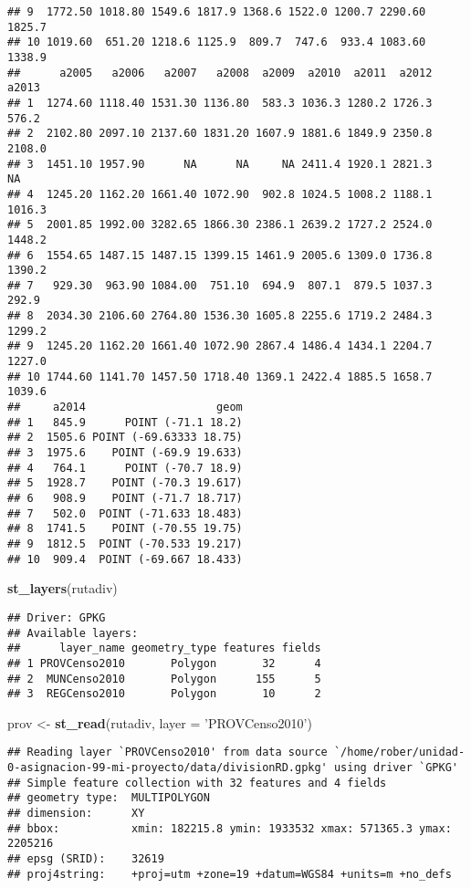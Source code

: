 \documentclass[11pt,]{article}
\newenvironment{Shaded}{\begin{snugshade}}{\end{snugshade}}
\newcommand{\KeywordTok}[1]{\textcolor[rgb]{0.13,0.29,0.53}{\textbf{#1}}}
\newcommand{\DataTypeTok}[1]{\textcolor[rgb]{0.13,0.29,0.53}{#1}}
\newcommand{\StringTok}[1]{\textcolor[rgb]{0.31,0.60,0.02}{#1}}
\newcommand{\NormalTok}[1]{#1}
\begin{document}
\begin{verbatim}
## 9  1772.50 1018.80 1549.6 1817.9 1368.6 1522.0 1200.7 2290.60 1825.7
## 10 1019.60  651.20 1218.6 1125.9  809.7  747.6  933.4 1083.60 1338.9
##      a2005   a2006   a2007   a2008  a2009  a2010  a2011  a2012  a2013
## 1  1274.60 1118.40 1531.30 1136.80  583.3 1036.3 1280.2 1726.3  576.2
## 2  2102.80 2097.10 2137.60 1831.20 1607.9 1881.6 1849.9 2350.8 2108.0
## 3  1451.10 1957.90      NA      NA     NA 2411.4 1920.1 2821.3     NA
## 4  1245.20 1162.20 1661.40 1072.90  902.8 1024.5 1008.2 1188.1 1016.3
## 5  2001.85 1992.00 3282.65 1866.30 2386.1 2639.2 1727.2 2524.0 1448.2
## 6  1554.65 1487.15 1487.15 1399.15 1461.9 2005.6 1309.0 1736.8 1390.2
## 7   929.30  963.90 1084.00  751.10  694.9  807.1  879.5 1037.3  292.9
## 8  2034.30 2106.60 2764.80 1536.30 1605.8 2255.6 1719.2 2484.3 1299.2
## 9  1245.20 1162.20 1661.40 1072.90 2867.4 1486.4 1434.1 2204.7 1227.0
## 10 1744.60 1141.70 1457.50 1718.40 1369.1 2422.4 1885.5 1658.7 1039.6
##     a2014                    geom
## 1   845.9      POINT (-71.1 18.2)
## 2  1505.6 POINT (-69.63333 18.75)
## 3  1975.6    POINT (-69.9 19.633)
## 4   764.1      POINT (-70.7 18.9)
## 5  1928.7    POINT (-70.3 19.617)
## 6   908.9    POINT (-71.7 18.717)
## 7   502.0  POINT (-71.633 18.483)
## 8  1741.5    POINT (-70.55 19.75)
## 9  1812.5  POINT (-70.533 19.217)
## 10  909.4  POINT (-69.667 18.433)
\end{verbatim}

\begin{Shaded}
\begin{Highlighting}[]
\KeywordTok{st_layers}\NormalTok{(rutadiv)}
\end{Highlighting}
\end{Shaded}

\begin{verbatim}
## Driver: GPKG 
## Available layers:
##      layer_name geometry_type features fields
## 1 PROVCenso2010       Polygon       32      4
## 2  MUNCenso2010       Polygon      155      5
## 3  REGCenso2010       Polygon       10      2
\end{verbatim}

\begin{Shaded}
\begin{Highlighting}[]
\NormalTok{prov <-}\StringTok{ }\KeywordTok{st_read}\NormalTok{(rutadiv, }\DataTypeTok{layer =} \StringTok{'PROVCenso2010'}\NormalTok{)}
\end{Highlighting}
\end{Shaded}

\begin{verbatim}
## Reading layer `PROVCenso2010' from data source `/home/rober/unidad-0-asignacion-99-mi-proyecto/data/divisionRD.gpkg' using driver `GPKG'
## Simple feature collection with 32 features and 4 fields
## geometry type:  MULTIPOLYGON
## dimension:      XY
## bbox:           xmin: 182215.8 ymin: 1933532 xmax: 571365.3 ymax: 2205216
## epsg (SRID):    32619
## proj4string:    +proj=utm +zone=19 +datum=WGS84 +units=m +no_defs
\end{verbatim}
\end{document}
